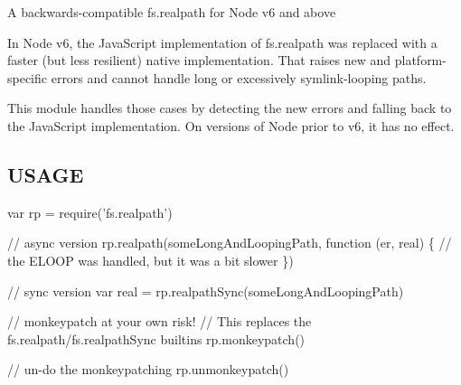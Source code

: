 A backwards-\/compatible fs.\+realpath for Node v6 and above

In Node v6, the Java\+Script implementation of fs.\+realpath was replaced with a faster (but less resilient) native implementation. That raises new and platform-\/specific errors and cannot handle long or excessively symlink-\/looping paths.

This module handles those cases by detecting the new errors and falling back to the Java\+Script implementation. On versions of Node prior to v6, it has no effect.

\subsection*{U\+S\+A\+GE}


\begin{DoxyCode}
var rp = require('fs.realpath')

// async version
rp.realpath(someLongAndLoopingPath, function (er, real) \{
  // the ELOOP was handled, but it was a bit slower
\})

// sync version
var real = rp.realpathSync(someLongAndLoopingPath)

// monkeypatch at your own risk!
// This replaces the fs.realpath/fs.realpathSync builtins
rp.monkeypatch()

// un-do the monkeypatching
rp.unmonkeypatch()
\end{DoxyCode}
 